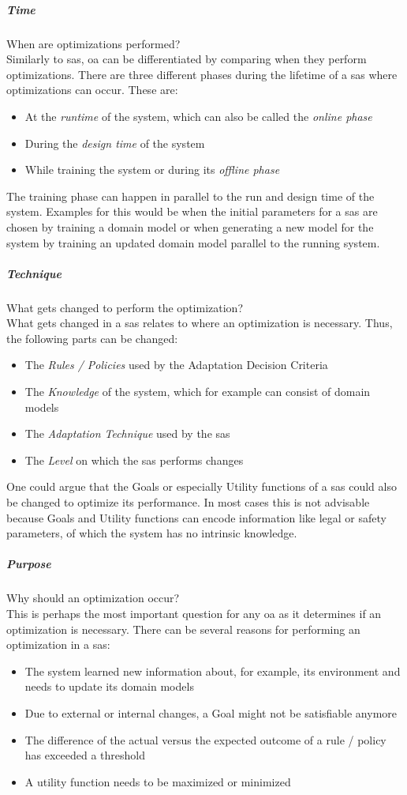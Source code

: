 \subparagraph*{Time}
When are optimizations performed? \\
Similarly to \acrshort{sas}, \acrshort{oa} can be differentiated by comparing when they perform optimizations.
There are three different phases during the lifetime of a \acrshort{sas} where optimizations can occur.
These are:
\begin{itemize}[nosep]
    \item At the \textit{runtime} of the system, which can also be called the \textit{online phase}
    \item During the \textit{design time} of the system
    \item While training the system or during its \textit{offline phase}
\end{itemize}
The training phase can happen in parallel to the run and design time of the system.
Examples for this would be when the initial parameters for a \acrshort{sas} are chosen by training a domain model
or when generating a new model for the system by training an updated domain model parallel to the running system.

\subparagraph*{Technique}
What gets changed to perform the optimization? \\
What gets changed in a \acrshort{sas} relates to where an optimization is necessary.
Thus, the following parts can be changed:
\begin{itemize}[nosep]
    \item The \textit{Rules / Policies} used by the Adaptation Decision Criteria
    \item The \textit{Knowledge} of the system, which for example can consist of domain models
    \item The \textit{Adaptation Technique} used by the \acrshort{sas}
    \item The \textit{Level} on which the \acrshort{sas} performs changes
\end{itemize}
One could argue that the Goals or especially Utility functions of a \acrshort{sas} could also be changed to optimize its performance.
In most cases this is not advisable because Goals and Utility functions can encode information
like legal or safety parameters, of which the system has no intrinsic knowledge.

\subparagraph*{Purpose}
Why should an optimization occur? \\
This is perhaps the most important question for any \acrshort{oa} as it determines if an optimization is necessary.
There can be several reasons for performing an optimization in a \acrshort{sas}:
\begin{itemize}[nosep]
    \item The system learned new information about, for example, its environment and needs to update its domain models
    \item Due to external or internal changes, a Goal might not be satisfiable anymore
    \item The difference of the actual versus the expected outcome of a rule / policy has exceeded a threshold
    \item A utility function needs to be maximized or minimized
\end{itemize}

